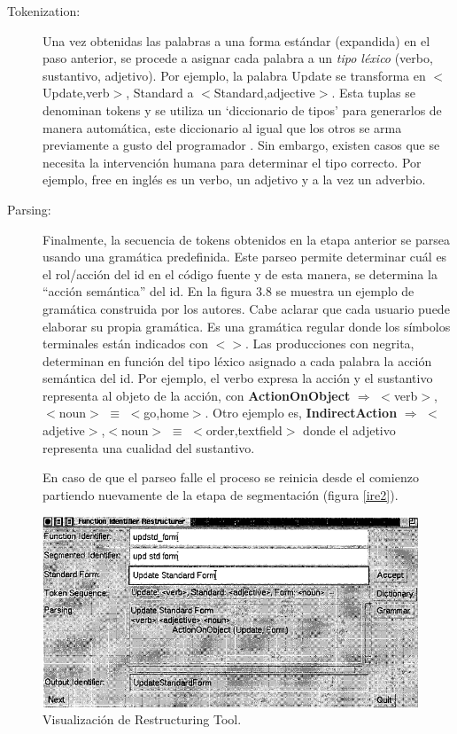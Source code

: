 \documentclass[a4paper,12pt]{report}
\begin{document}
\begin{description}
\item[Tokenization:] Una vez obtenidas las palabras a una forma estándar (expandida) en el paso anterior, se procede a asignar cada palabra a un \textit{tipo léxico} (verbo, sustantivo, adjetivo). Por ejemplo, la palabra \textsf{Update} se transforma en $<$Update,verb$>$, \textsf{Standard} a $<$Standard,adjective$>$. Esta tuplas se denominan tokens y se utiliza un `diccionario de tipos' para generarlos de manera automática, este diccionario al igual que los otros se arma previamente a gusto del programador \cite{BCPT99}. Sin embargo, existen casos que se necesita la intervención humana para determinar el tipo correcto. Por ejemplo, \textsf{free} en inglés es un verbo, un adjetivo y a la vez un adverbio.%

\item[Parsing:] Finalmente, la secuencia de tokens obtenidos en la etapa anterior se parsea usando una gramática predefinida. Este parseo permite determinar cuál es el rol/acción del id en el código fuente y de esta manera, se determina la “acción semántica” del id. 
En la figura 3.8 se muestra un ejemplo de gramática construida por los autores. Cabe aclarar que cada usuario puede elaborar su propia gramática. 
Es una gramática regular donde los símbolos terminales están indicados con $<>$. Las producciones con negrita, determinan en función del tipo léxico asignado a cada palabra la acción semántica del id.
Por ejemplo, el verbo expresa la acción y el sustantivo representa al objeto de la acción, con \textbf{ActionOnObject} $\Rightarrow$ $<$verb$>$,$<$noun$>$ $\equiv$ $<$go,home$>$. Otro ejemplo es, \textbf{IndirectAction} $\Rightarrow$ $<$adjetive$>$,$<$noun$>$ $\equiv$ $<$order,textfield$>$ donde el adjetivo representa una cualidad del sustantivo.

En caso de que el parseo falle el proceso se reinicia desde el comienzo partiendo nuevamente de la etapa de segmentación \cite{BCPT00} (figura \ref{ire2}).
\end{description}

\begin{figure}[ht] %
\centerline{%
\includegraphics[scale= 0.67]{./ire_4.png}
}
\caption{Visualización de Restructuring Tool.}
\label{ire4}
\end{figure}
\end{document}
